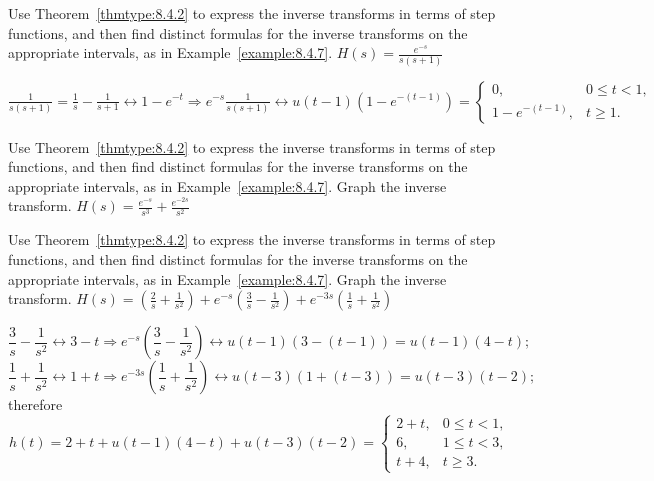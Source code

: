 \documentclass{ximera}
\begin{document}
\begin{problem}\label{exer:8.4.20}
Use Theorem~\ref{thmtype:8.4.2} to express the inverse transforms in terms of step functions, and then find distinct formulas for the inverse transforms on the appropriate intervals, as in
Example~\ref{example:8.4.7}.
$H(s)=\frac{e^{-s}}{s(s+1)}$

\begin{solution}
$\frac{1}{s(s+1)}=\frac{1}{s}-\frac{1}{s+1}\leftrightarrow
 1-e^{-t}
\Rightarrow
e^{-s}\frac{1}{s(s+1)}\leftrightarrow
u(t-1)\left(1-e^{-(t-1)}\right)=
\left\{\begin{array}{cl} 0,&0\le t<1,\\
1-e^{-(t-1)},&t\ge1.\end{array}\right.$
\end{solution}
\end{problem}

\begin{problem}\label{exer:8.4.21}
Use Theorem~\ref{thmtype:8.4.2} to express the inverse transforms in terms of step functions, and then find distinct formulas for the inverse transforms on the appropriate intervals, as in
Example~\ref{example:8.4.7}.  Graph the inverse transform. 
$H(s)=\frac{e^{-s}}{s^3}+
\frac{e^{-2s}}{s^2}$
\end{problem}

\begin{problem}\label{exer:8.4.22} Use Theorem~\ref{thmtype:8.4.2} to express the inverse transforms in terms of step functions, and then find distinct formulas for the inverse transforms on the appropriate intervals, as in
Example~\ref{example:8.4.7}.  Graph the inverse transform.  $H(s)=\left(\frac{2}{s}+\frac{1}{s^2}\right)
+e^{-s}\left(\frac{3}{s}-\frac{1}{s^2}\right)+e^{-3s}\left(\frac{1}{s}+\frac{1}{s^2}\right)$

\begin{solution}
$$
\frac{3}{s}-\frac{1}{s^2}\leftrightarrow 3-t\Rightarrow
e^{-s}\left(\frac{3}{s}-\frac{1}{s^2}\right)\leftrightarrow
u(t-1)\left(3-(t-1)\right)=u(t-1)(4-t);
$$
$$
\frac{1}{s}+\frac{1}{s^2}\leftrightarrow 1+t\Rightarrow
e^{-3s}\left(\frac{1}{s}+\frac{1}{s^2}\right)\leftrightarrow
u(t-3)\left(1+(t-3)\right)=u(t-3)(t-2);
$$
therefore
$$
h(t)=2+t+u(t-1)(4-t)+u(t-3)(t-2)=\left\{\begin{array}{cl} 2+t,&
0\le t<1,\\  6,&1\le t<3,\\  t+4,&t\ge
3.\end{array}\right.
$$
\end{solution}
\end{problem}
\end{document}
